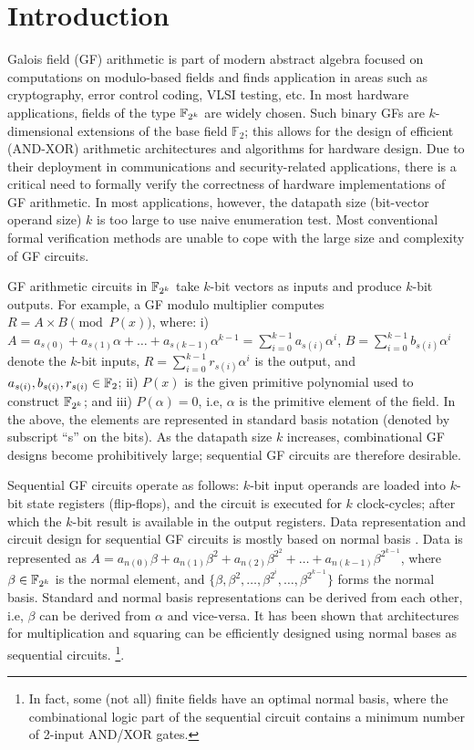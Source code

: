 \section{Introduction}
\label{sec:intro}

Galois field (GF) arithmetic is part of modern abstract algebra focused on 
computations on modulo-based fields
and finds application in areas such as 
cryptography, error control coding, VLSI testing, etc. In most
hardware applications, fields of the type ${\mathbb{F}}_{2^k}$ are widely
chosen. Such { binary} GFs are $k$-dimensional extensions
of the base field ${\mathbb{F}}_2$; this allows for the design of
efficient (AND-XOR) arithmetic architectures and algorithms for
hardware design. Due to their deployment in communications and
security-related applications, there is a critical need to {
  formally verify} the correctness of hardware implementations of GF
arithmetic. In most applications, however, the datapath size
(bit-vector operand size) $k$ is too large to use naive enumeration test. Most conventional formal
verification methods are unable to cope with the large size and
complexity of GF circuits. 

GF arithmetic circuits in ${\mathbb{F}}_{2^k}$ take $k$-bit vectors as inputs and
produce $k$-bit outputs. For example, a GF modulo multiplier computes
$R = A \times B \pmod{ P(x)}$, where: i) $A = a_{s(0)} + a_{s(1)}\alpha +
\dots + a_{s(k-1)} \alpha^{k-1} = \sum _{i=0}^{k-1} a_{s(i)}\alpha^i$,
$B = \sum_{i=0}^{k-1}b_{s(i)} \alpha^{i}$ denote the $k$-bit inputs,
$R = \sum _{i=0} ^{k-1} r_{s(i)} \alpha^i$ is the output, and $a_{s(i)},
b_{s(i)}, r_{s(i)} \in {\mathbb{F}}_{2}$; ii) $P(x)$ is the given primitive
polynomial used to construct ${\mathbb{F}}_{2^k}$; and iii) $P(\alpha) = 0$,
i.e, $\alpha$ is the primitive element of the field. In the above, the
elements are represented in { standard basis notation} (denoted by
subscript ``s'' on the bits). As the datapath size $k$ increases,
combinational GF designs become prohibitively large;
sequential GF circuits are therefore desirable. 

Sequential GF circuits operate as follows: $k$-bit input operands are
loaded into $k$-bit state registers (flip-flops), and the circuit is
executed for $k$ clock-cycles; after which the $k$-bit result is
available in the output registers. Data representation and circuit
design for sequential GF circuits is mostly based on { normal basis}
\cite{gao:phd_normal_basis}. Data is represented as $A = a_{n(0)}
\beta + a_{n(1)} \beta^2 + a_{n(2)} \beta^{2^2} + \dots + a_{n(k-1)}
\beta^{2^{k-1}}$, where $\beta \in {\mathbb{F}}_{2^k}$ is the { normal
  element}, and $\{\beta, \beta^2, \dots, \beta^{2^i}, \dots,
\beta^{2^{k-1}}\}$ forms the normal basis. Standard and normal basis
representations can be derived from each other, i.e, $\beta$ can be
derived from $\alpha$ and vice-versa. It has been shown that
architectures for multiplication and  squaring can be efficiently
designed using normal bases  \cite{agnew1991implementation} 
\cite{RHmulti} \cite{gao:phd_normal_basis} as sequential circuits. 
\footnote{In fact, some (not all) finite fields have an
  { optimal normal basis}, where the combinational logic part of
  the sequential circuit contains a minimum number of 2-input AND/XOR
  gates.}.

